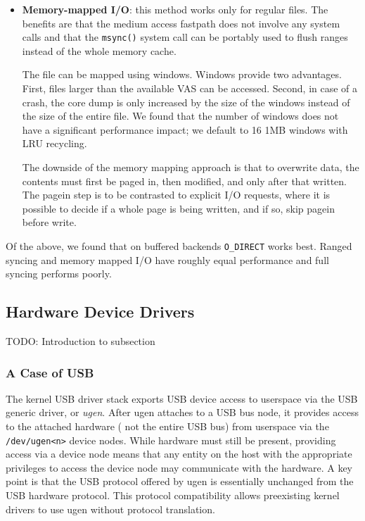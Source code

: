 \begin{itemize}
\item   \textbf{Memory-mapped I/O}: this method
        works only for regular files.  The benefits are that the
        medium access fastpath does not involve any system calls
        and that the \texttt{msync()} system call can be portably
        used to flush ranges instead of the whole memory cache.

	The file can be mapped using windows.  Windows provide two
	advantages.  First, files larger than the available VAS
	can be accessed.  Second, in case of a crash, the core dump is only
	increased by the size of the windows instead of the size of the
	entire file.  We found that the number of windows does not have a
	significant performance impact; we default to 16 1MB windows
	with LRU recycling.

        The downside of the memory mapping approach is that to
        overwrite data, the contents must first be paged in, then
        modified, and only after that written.  The pagein step is to
        be contrasted to explicit I/O requests, where it is possible to
        decide if a whole page is being written, and if so, skip pagein
        before write.
\end{itemize}

Of the above, we found that on buffered backends \verb+O_DIRECT+
works best.  Ranged syncing and memory mapped I/O have roughly
equal performance and full syncing performs poorly.


\subsection{Hardware Device Drivers}

TODO: Introduction to subsection

\subsubsection{A Case of USB}
\label{sect:usb}

The kernel USB driver stack exports USB device access to userspace
via the USB generic driver, or \textit{ugen}.  After ugen attaches
to a USB bus node, it provides access to the attached hardware (\ie
not the entire USB bus) from userspace via the \texttt{/dev/ugen<n>}
device nodes.  While hardware must still be present, providing
access via a device node means that any entity on the host with
the appropriate privileges to access the device node may communicate
with the hardware.  A key point is that the USB protocol offered
by ugen is essentially unchanged from the USB hardware protocol.
This protocol compatibility allows preexisting kernel drivers to use ugen
without protocol translation.

